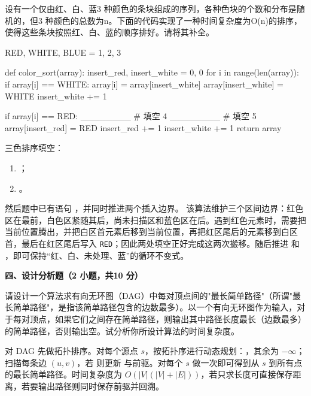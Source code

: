 \begin{question}
设有一个仅由红、白、蓝3 种颜色的条块组成的序列，各种色块的个数和分布是随机的，但3 种颜色的总数为n。下面的代码实现了一种时间复杂度为O(n)的排序，使得这些条块按照红、白、蓝的顺序排好。请将其补全。\\
\begin{pycode}
RED, WHITE, BLUE = 1, 2, 3


def color_sort(array):
    insert_red, insert_white = 0, 0
    for i in range(len(array)):
        if array[i] == WHITE:
            array[i] = array[insert_white]
            array[insert_white] = WHITE
            insert_white += 1

        if array[i] == RED:
            ________                    # 填空 4
            ________                    # 填空 5
            array[insert_red] = RED
            insert_red += 1
            insert_white += 1
    return array
\end{pycode}
\begin{solution}
三色排序填空：
  \begin{enumerate}[leftmargin=2em]
    \item \texttt{}；
    \item \texttt{}。
  \end{enumerate}
  然后题中已有语句 \texttt{}，并同时推进两个插入边界。
该算法维护三个区间边界：红色区在最前，白色区紧随其后，尚未扫描区和蓝色区在后。遇到红色元素时，需要把当前位置腾出，并把白区首元素后移到当前位置，再把红区尾后的元素移到白区首，最后在红区尾后写入 \texttt{RED}；因此两处填空正好完成这两次搬移。随后推进 \texttt{} 和 \texttt{}，即可保持“红、白、未处理、蓝”的循环不变式。
\end{solution}
\end{question}

\textbf{四、设计分析题（2 小题，共10 分）}
\begin{question}[6 分]
请设计一个算法求有向无环图（DAG）中每对顶点间的"最长简单路径"（所谓"最长简单路径"，是指该简单路径包含的边数最多）。以一个有向无环图作为输入，对于每对顶点，如果它们之间存在简单路径，则输出其中路径长度最长（边数最多）的简单路径，否则输出空。试分析你所设计算法的时间复杂度。

\begin{solution}
对 DAG 先做拓扑排序。对每个源点 $s$，按拓扑序进行动态规划：\texttt{}，其余为 $-\infty$；扫描每条边 $(u,v)$，若 \texttt{} 则更新 \texttt{} 与前驱。对每个 $s$ 做一次即可得到从 $s$ 到所有点的最长简单路径。时间复杂度为 $O(|V|(|V|+|E|))$，若只求长度可直接保存距离，若要输出路径则同时保存前驱并回溯。
\end{solution}
\end{question}


